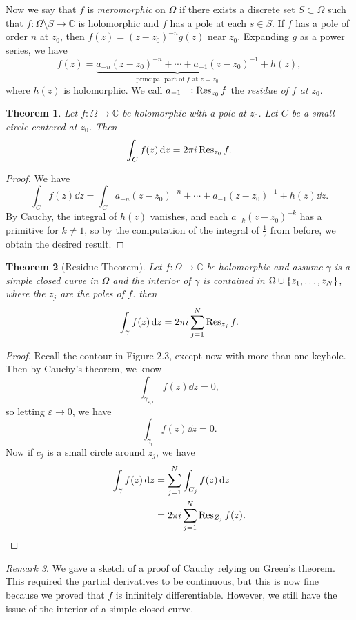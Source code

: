 \documentclass[leqno, openany]{memoir}
\newtheorem{thm}{Theorem}[section]
\theoremstyle{definition}
\theoremstyle{remark}
\newtheorem{rmk}[thm]{Remark}
\theoremstyle{plain}
\theoremstyle{definition}
\theoremstyle{remark}
\newcommand{\C}{\mathbb{C}}
\newcommand{\ep}{\varepsilon}
\begin{document}
Now we say that $f$ is \textit{meromorphic} on $\Omega$ if there exists a
discrete set $S \subset \Omega$ such that $f \colon \Omega \setminus S \to \C$
is holomorphic and $f$ has a pole at each $s \in S$. If $f$ has a pole of order
$n$ at $z_0$, then $f(z) = (z-z_0)^{-n} g(z)$ near $z_0$. Expanding $g$ as a
power series, we have \[ f(z) = \underbrace{a_{-n} {(z-z_0)}^{-n} + \cdots +
a_{-1} {(z-z_0)}^{-1}}_{\text{principal part of $f$ at $z=z_0$}} + h(z), \]
where $h(z)$ is holomorphic. We call $a_{-1} \eqqcolon \Res_{z_0} f$ the
\textit{residue of $f$ at $z_0$}.

\begin{thm} Let $f \colon \Omega \to \C$ be holomorphic with a pole at $z_0$.
    Let $C$ be a small circle centered at $z_0$. Then \[ \int_C f(z) \dd{z} = 2
    \pi i \Res_{z_0} f. \] \end{thm}

\begin{proof} We have \[ \int_C f(z) \dd{z} = \int_C a_{-n} {(z-z_0)}^{-n} +
\cdots + a_{-1}{(z-z_0)}^{-1} + h(z) \dd{z}. \] By Cauchy, the integral of
$h(z)$ vanishes, and each $a_{-k} {(z-z_0)}^{-k}$ has a primitive for $k \neq
1$, so by the computation of the integral of $\frac{1}{z}$ from before, we
obtain the desired result.  \end{proof}

\begin{thm}[Residue Theorem] Let $f \colon \Omega \to \C$ be holomorphic and
    assume $\gamma$ is a simple closed curve in $\Omega$ and the interior of
    $\gamma$ is contained in $\Omega \cup \qty{z_1, \ldots, z_N}$, where the
    $z_j$ are the poles of $f$. then \[ \int_{\gamma} f(z) \dd{z} = 2 \pi i
    \sum_{j=1}^N \Res_{z_j} f. \] \end{thm}

\begin{proof} Recall the contour in Figure 2.3, except now with more than one
    keyhole. Then by Cauchy's theorem, we know \[ \int_{\gamma_{\ep, r}} f(z)
        \dd{z} = 0, \] so letting $\ep \to 0$, we have \[ \int_{\gamma_r} f(z)
    \dd{z} = 0. \] Now if $c_j$ is a small circle around $z_j$, we have
    \begin{align*} \int_{\gamma} f(z) \dd{z} &= \sum_{j=1}^N \int_{C_j} f(z)
    \dd{z} \\ &= 2 \pi i \sum_{j=1}^N \Res_{Z_j} f(z). \qedhere \end{align*}
    \end{proof}

\begin{rmk} We gave a sketch of a proof of Cauchy relying on Green's theorem.
    This required the partial derivatives to be continuous, but this is now
    fine because we proved that $f$ is infinitely differentiable. However, we
    still have the issue of the interior of a simple closed curve.  \end{rmk}
\end{document}
